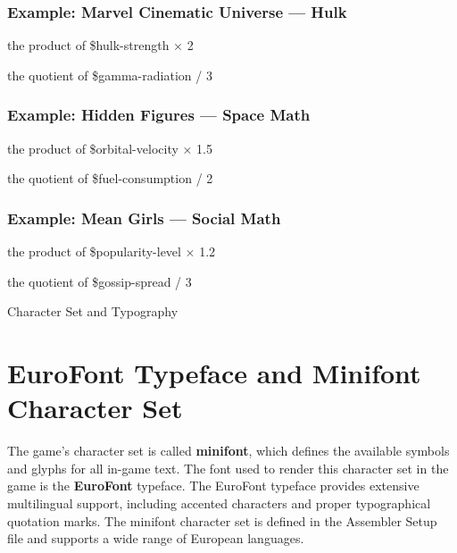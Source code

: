 \documentclass[11pt,letterpaper,oldstylefigures]{memoir}
\makeatletter
\newcommand{\stagedir}[1]{#1\par\vspace{1\baselineskip}}
\newenvironment{FountainExample}
  {\begingroup
  \ttfamily\small
   \setlength{\parindent}{0pt}
  \setlength{\parskip}{0.5em}
  \allowdisplaybreaks
  \setlength{\displaywidowpenalty}{0}
  \setlength{\widowpenalty}{0}
  \setlength{\clubpenalty}{0}
  \setlength{\interlinepenalty}{0}
}
  {\endgroup}
\let\oldchapter\chapter
\def\chapter{%
  \@ifstar
    {\FountainScripting@starchapter}%
    {\@dblarg\FountainScripting@chapter}}
\def\FountainScripting@starchapter#1{\oldchapter*{#1}\chaptermark{#1}}
\def\FountainScripting@chapter[#1]#2{\oldchapter[#1]{#2}\chaptermark{#2}}
\makeatother
\begin{document}
\subsubsection{Example: Marvel Cinematic Universe — Hulk}

\begin{FountainExample}
\stagedir{the product of \$hulk-strength × 2}
\end{FountainExample}

\begin{FountainExample}
\stagedir{the quotient of \$gamma-radiation / 3}
\end{FountainExample}

\subsubsection{Example: Hidden Figures — Space Math}
\begin{FountainExample}
\stagedir{the product of \$orbital-velocity × 1.5}
\end{FountainExample}
\begin{FountainExample}
\stagedir{the quotient of \$fuel-consumption / 2}
\end{FountainExample}

\subsubsection{Example: Mean Girls — Social Math}

\begin{FountainExample}
\stagedir{the product of \$popularity-level × 1.2}
\end{FountainExample}

\begin{FountainExample}
\stagedir{the quotient of \$gossip-spread / 3}
\end{FountainExample}

\chapter{Character Set and Typography}
\section{EuroFont Typeface and Minifont Character Set}

The game's character set is called \textbf{minifont}, which defines the available symbols and glyphs for all in-game text. The font used to render this character set in the game is the \textbf{EuroFont} typeface. The EuroFont typeface provides extensive multilingual support, including accented characters and proper typographical quotation marks. The minifont character set is defined in the Assembler Setup file and supports a wide range of European languages.
\end{document}
